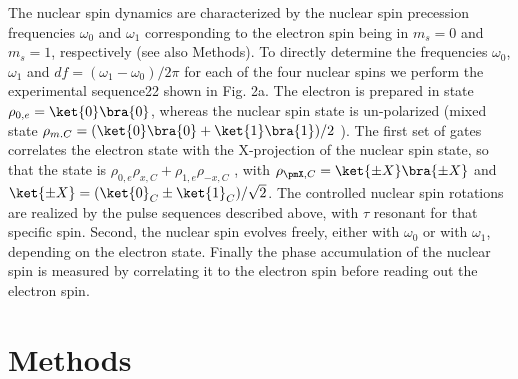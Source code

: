 The nuclear spin dynamics are characterized by the nuclear spin precession frequencies $\omega_0$ and $\omega_1$  corresponding to the electron spin being in $m_s = 0$ and $m_s = 1$, respectively (see also Methods). To directly determine the frequencies $\omega_0$,  $\omega_1$ and $df = ( \omega_1 − \omega_0 )/2 \pi$  for each of the four nuclear spins we perform the experimental sequence22 shown in Fig. 2a. The electron is prepared in state $\rho_{0,e} = \ket{0}\bra{0}$, whereas the nuclear spin state is un-polarized (mixed state $\rho_{m.C} = (\ket{0}\bra{0} + \ket{1}\bra{1})/2$ ). The first set of gates correlates the electron state with the X-projection of the nuclear spin state, so that the state is $\rho_{0,e} \rho_{x,C} + \rho_{1,e} \rho_{-x,C}$ , with $\rho_{\pmX,C} = \ket{\pm X}\bra{\pm X}$ and  $\ket{\pm X} = (\ket{0}_C \pm \ket{1}_C)/\sqrt{2}$. The controlled nuclear spin rotations are realized by the pulse sequences described above, with $\tau$ resonant for that specific spin. Second, the nuclear spin evolves freely, either with $\omega_0$ or with $\omega_1$, depending on the electron state. Finally the phase accumulation of the nuclear spin is measured by correlating it to the electron spin before reading out the electron spin. 

\section{Methods}



\newpage




